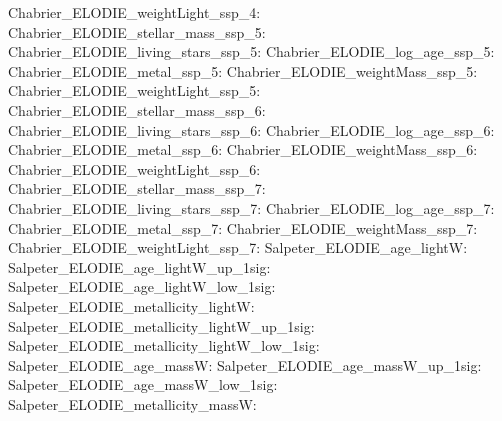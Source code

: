 Chabrier\_ELODIE\_weightLight\_ssp\_4:  \newline 
Chabrier\_ELODIE\_stellar\_mass\_ssp\_5:  \newline 
Chabrier\_ELODIE\_living\_stars\_ssp\_5:  \newline 
Chabrier\_ELODIE\_log\_age\_ssp\_5:  \newline 
Chabrier\_ELODIE\_metal\_ssp\_5:  \newline 
Chabrier\_ELODIE\_weightMass\_ssp\_5:  \newline 
Chabrier\_ELODIE\_weightLight\_ssp\_5:  \newline 
Chabrier\_ELODIE\_stellar\_mass\_ssp\_6:  \newline 
Chabrier\_ELODIE\_living\_stars\_ssp\_6:  \newline 
Chabrier\_ELODIE\_log\_age\_ssp\_6:  \newline 
Chabrier\_ELODIE\_metal\_ssp\_6:  \newline 
Chabrier\_ELODIE\_weightMass\_ssp\_6:  \newline 
Chabrier\_ELODIE\_weightLight\_ssp\_6:  \newline 
Chabrier\_ELODIE\_stellar\_mass\_ssp\_7:  \newline 
Chabrier\_ELODIE\_living\_stars\_ssp\_7:  \newline 
Chabrier\_ELODIE\_log\_age\_ssp\_7:  \newline 
Chabrier\_ELODIE\_metal\_ssp\_7:  \newline 
Chabrier\_ELODIE\_weightMass\_ssp\_7:  \newline 
Chabrier\_ELODIE\_weightLight\_ssp\_7:  \newline 
Salpeter\_ELODIE\_age\_lightW:  \newline 
Salpeter\_ELODIE\_age\_lightW\_up\_1sig:  \newline 
Salpeter\_ELODIE\_age\_lightW\_low\_1sig:  \newline 
Salpeter\_ELODIE\_metallicity\_lightW:  \newline 
Salpeter\_ELODIE\_metallicity\_lightW\_up\_1sig:  \newline 
Salpeter\_ELODIE\_metallicity\_lightW\_low\_1sig:  \newline 
Salpeter\_ELODIE\_age\_massW:  \newline 
Salpeter\_ELODIE\_age\_massW\_up\_1sig:  \newline 
Salpeter\_ELODIE\_age\_massW\_low\_1sig:  \newline 
Salpeter\_ELODIE\_metallicity\_massW:  \newline 
